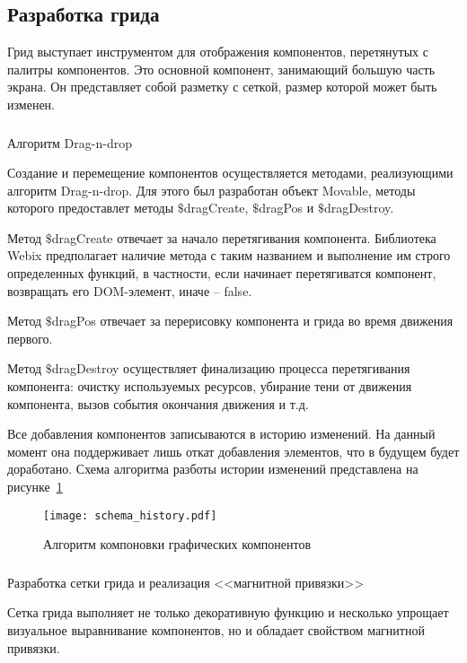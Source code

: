 \subsection{Разработка грида}
\label{sec:development:grid}

Грид выступает инструментом для отображения компонентов, перетянутых с палитры компонентов. Это основной компонент, занимающий большую часть экрана. Он представляет собой разметку с сеткой, размер которой может быть изменен.

\subsubsection{}Алгоритм Drag-n-drop
\

Создание и перемещение компонентов осуществляется методами, реализующими алгоритм Drag-n-drop. Для этого был разработан объект Movable, методы которого предоставлет методы $\$$dragCreate, $\$$dragPos и $\$$dragDestroy.

Метод $\$$dragCreate отвечает за начало перетягивания компонента. Библиотека Webix предполагает наличие метода с таким названием и выполнение им строго определенных функций, в частности, если начинает перетягиватся компонент, возвращать его DOM-элемент, иначе -- false.

Метод $\$$dragPos отвечает за перерисовку компонента и грида во время движения первого. 

Метод $\$$dragDestroy осуществляет финализацию процесса перетягивания компонента: очистку используемых ресурсов, убирание тени от движения компонента, вызов события окончания движения и т.д.

Все добавления компонентов записываются в историю изменений. На данный момент она поддерживает лишь откат добавления элементов, что в будущем будет доработано. Схема алгоритма разботы истории изменений представлена на рисунке~\ref{sec:dev:history}

\begin{figure}[ht]
  \centering
    \texttt{[image: schema\_history.pdf]}
    \caption{Алгоритм компоновки графических компонентов}
    \label{sec:dev:history}
\end{figure}

\subsubsection{}Разработка сетки грида и реализация <<магнитной привязки>>
\

Сетка грида выполняет не только декоративную функцию и несколько упрощает визуальное выравнивание компонентов, но и обладает свойством магнитной привязки.

